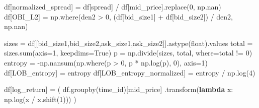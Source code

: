 \documentclass[
  letterpaper,
  DIV=11,
  numbers=noendperiod]{scrartcl}
\newenvironment{Shaded}{\begin{snugshade}}{\end{snugshade}}
\newcommand{\BuiltInTok}[1]{\textcolor[rgb]{0.00,0.23,0.31}{#1}}
\newcommand{\DecValTok}[1]{\textcolor[rgb]{0.68,0.00,0.00}{#1}}
\newcommand{\KeywordTok}[1]{\textcolor[rgb]{0.00,0.23,0.31}{\textbf{#1}}}
\newcommand{\NormalTok}[1]{\textcolor[rgb]{0.00,0.23,0.31}{#1}}
\newcommand{\OperatorTok}[1]{\textcolor[rgb]{0.37,0.37,0.37}{#1}}
\newcommand{\StringTok}[1]{\textcolor[rgb]{0.13,0.47,0.30}{#1}}
\newcommand{\VariableTok}[1]{\textcolor[rgb]{0.07,0.07,0.07}{#1}}
\begin{document}
\begin{Shaded}
\begin{Highlighting}[]
\NormalTok{    df[}\StringTok{\textquotesingle{}normalized\_spread\textquotesingle{}}\NormalTok{] }\OperatorTok{=}\NormalTok{ df[}\StringTok{\textquotesingle{}spread\textquotesingle{}}\NormalTok{] }\OperatorTok{/}\NormalTok{ df[}\StringTok{\textquotesingle{}mid\_price\textquotesingle{}}\NormalTok{].replace(}\DecValTok{0}\NormalTok{, np.nan)}
\NormalTok{    df[}\StringTok{\textquotesingle{}OBI\_L2\textquotesingle{}}\NormalTok{] }\OperatorTok{=}\NormalTok{ np.where(den2 }\OperatorTok{\textgreater{}} \DecValTok{0}\NormalTok{, (df[}\StringTok{\textquotesingle{}bid\_size1\textquotesingle{}}\NormalTok{] }\OperatorTok{+}\NormalTok{ df[}\StringTok{\textquotesingle{}bid\_size2\textquotesingle{}}\NormalTok{]) }\OperatorTok{/}\NormalTok{ den2, np.nan)}

\NormalTok{    sizes }\OperatorTok{=}\NormalTok{ df[[}\StringTok{\textquotesingle{}bid\_size1\textquotesingle{}}\NormalTok{,}\StringTok{\textquotesingle{}bid\_size2\textquotesingle{}}\NormalTok{,}\StringTok{\textquotesingle{}ask\_size1\textquotesingle{}}\NormalTok{,}\StringTok{\textquotesingle{}ask\_size2\textquotesingle{}}\NormalTok{]].astype(}\BuiltInTok{float}\NormalTok{).values}
\NormalTok{    total }\OperatorTok{=}\NormalTok{ sizes.}\BuiltInTok{sum}\NormalTok{(axis}\OperatorTok{=}\DecValTok{1}\NormalTok{, keepdims}\OperatorTok{=}\VariableTok{True}\NormalTok{)}
\NormalTok{    p }\OperatorTok{=}\NormalTok{ np.divide(sizes, total, where}\OperatorTok{=}\NormalTok{total }\OperatorTok{!=} \DecValTok{0}\NormalTok{)}
\NormalTok{    entropy }\OperatorTok{=} \OperatorTok{{-}}\NormalTok{np.nansum(np.where(p }\OperatorTok{\textgreater{}} \DecValTok{0}\NormalTok{, p }\OperatorTok{*}\NormalTok{ np.log(p), }\DecValTok{0}\NormalTok{), axis}\OperatorTok{=}\DecValTok{1}\NormalTok{)}
\NormalTok{    df[}\StringTok{\textquotesingle{}LOB\_entropy\textquotesingle{}}\NormalTok{] }\OperatorTok{=}\NormalTok{ entropy}
\NormalTok{    df[}\StringTok{\textquotesingle{}LOB\_entropy\_normalized\textquotesingle{}}\NormalTok{] }\OperatorTok{=}\NormalTok{ entropy }\OperatorTok{/}\NormalTok{ np.log(}\DecValTok{4}\NormalTok{)}

\NormalTok{    df[}\StringTok{\textquotesingle{}log\_return\textquotesingle{}}\NormalTok{] }\OperatorTok{=}\NormalTok{ (}
\NormalTok{        df.groupby(}\StringTok{\textquotesingle{}time\_id\textquotesingle{}}\NormalTok{)[}\StringTok{\textquotesingle{}mid\_price\textquotesingle{}}\NormalTok{]}
\NormalTok{          .transform(}\KeywordTok{lambda}\NormalTok{ x: np.log(x }\OperatorTok{/}\NormalTok{ x.shift(}\DecValTok{1}\NormalTok{)))}
\NormalTok{    )}


\end{Highlighting}
\end{Shaded}
\end{document}
